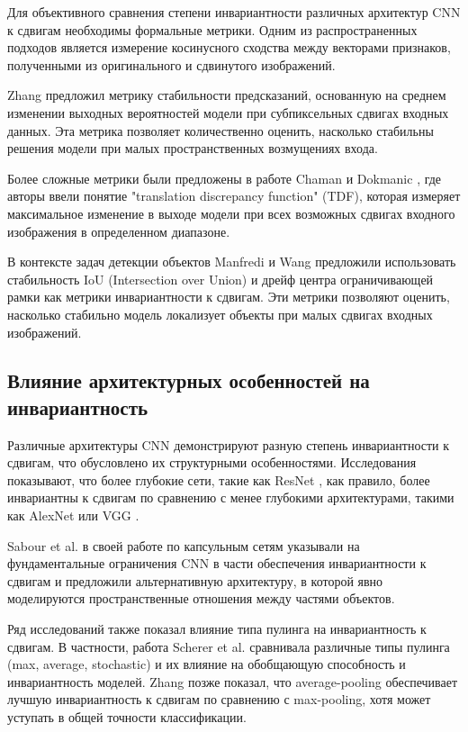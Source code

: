 Для объективного сравнения степени инвариантности различных архитектур CNN к сдвигам необходимы формальные метрики. Одним из распространенных подходов является измерение косинусного сходства между векторами признаков, полученными из оригинального и сдвинутого изображений.

Zhang \cite{Zhang2019} предложил метрику стабильности предсказаний, основанную на среднем изменении выходных вероятностей модели при субпиксельных сдвигах входных данных. Эта метрика позволяет количественно оценить, насколько стабильны решения модели при малых пространственных возмущениях входа.

Более сложные метрики были предложены в работе Chaman и Dokmanic \cite{Chaman2021}, где авторы ввели понятие "translation discrepancy function" (TDF), которая измеряет максимальное изменение в выходе модели при всех возможных сдвигах входного изображения в определенном диапазоне.

В контексте задач детекции объектов Manfredi и Wang \cite{Manfredi2020} предложили использовать стабильность IoU (Intersection over Union) и дрейф центра ограничивающей рамки как метрики инвариантности к сдвигам. Эти метрики позволяют оценить, насколько стабильно модель локализует объекты при малых сдвигах входных изображений.

\subsection{Влияние архитектурных особенностей на инвариантность}
\label{review:invariance:architectures}

Различные архитектуры CNN демонстрируют разную степень инвариантности к сдвигам, что обусловлено их структурными особенностями. Исследования показывают, что более глубокие сети, такие как ResNet \cite{He2016}, как правило, более инвариантны к сдвигам по сравнению с менее глубокими архитектурами, такими как AlexNet или VGG \cite{Simonyan2014}.

Sabour et al. \cite{Sabour2017} в своей работе по капсульным сетям указывали на фундаментальные ограничения CNN в части обеспечения инвариантности к сдвигам и предложили альтернативную архитектуру, в которой явно моделируются пространственные отношения между частями объектов.

Ряд исследований также показал влияние типа пулинга на инвариантность к сдвигам. В частности, работа Scherer et al. \cite{Scherer2010} сравнивала различные типы пулинга (max, average, stochastic) и их влияние на обобщающую способность и инвариантность моделей. Zhang \cite{Zhang2019} позже показал, что average-pooling обеспечивает лучшую инвариантность к сдвигам по сравнению с max-pooling, хотя может уступать в общей точности классификации.

